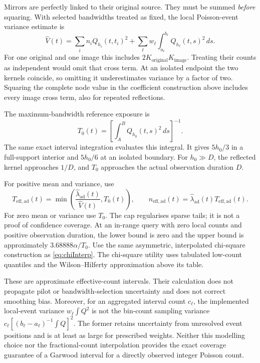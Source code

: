 \documentclass[11pt,a4paper]{article}
\begin{document}
Mirrors are perfectly linked to their original source.  They must be
summed \emph{before} squaring.  With selected bandwidths treated as fixed,
the local Poisson-event variance estimate is
\begin{equation}
  \widehat V(t)=\sum_i n_i Q_{h_i}(t,t_i)^2
      +\sum_\ell w_\ell\int_{a_\ell}^{b_\ell}Q_{h_\ell}(t,s)^2\,ds.
  \label{eq:adaptiveVariance}
\end{equation}
For one original and one image this includes
$2K_{\mathrm{original}}K_{\mathrm{image}}$.  Treating their counts as
independent would omit that cross term.  At an isolated endpoint the two
kernels coincide, so omitting it underestimates variance by a factor of
two.  Squaring the complete node value in the coefficient construction
above includes every image cross term, also for repeated reflections.

The maximum-bandwidth reference exposure is
\begin{equation}
  T_0(t)=\left[\int_A^B Q_{h_0}(t,s)^2\,ds\right]^{-1}.
  \label{eq:reflectedExposure}
\end{equation}
The same exact interval integration evaluates this integral.  It gives
$5h_0/3$ in a full-support interior and $5h_0/6$ at an isolated boundary.
For $h_0\gg D$, the reflected kernel approaches $1/D$, and $T_0$
approaches the actual observation duration $D$.

For positive mean and variance, use
\begin{equation}
  T_{\mathrm{eff,ad}}(t)
    =\min\!\left(\frac{\hat\lambda_{\mathrm{ad}}(t)}{\widehat V(t)},T_0(t)\right),
  \qquad n_{\mathrm{eff,ad}}(t)=\hat\lambda_{\mathrm{ad}}(t)T_{\mathrm{eff,ad}}(t).
  \label{eq:adaptiveEffective}
\end{equation}
For zero mean or variance use $T_0$.  The cap regularises sparse tails;
it is not a proof of confidence coverage.  At an in-range query with zero
local counts and positive observation duration, the lower bound is zero
and the upper bound is approximately $3.68888\alpha/T_0$.
Use the same asymmetric, interpolated chi-square construction as
\eqref{eq:chiInterp}.  The chi-square utility uses tabulated low-count
quantiles and the Wilson--Hilferty approximation above its table.

These are approximate effective-count intervals.  Their calculation does
not propagate pilot or bandwidth-selection uncertainty and does not
correct smoothing bias.  Moreover, for an aggregated interval count
$c_\ell$, the implemented local-event variance
$w_\ell\int Q^2$ is not the bin-count sampling variance
$c_\ell[(b_\ell-a_\ell)^{-1}\int Q]^2$.  The former retains uncertainty
from unresolved event positions and is at least as large for prescribed
weights.  Neither this modelling choice nor the fractional-count
interpolation provides the exact coverage guarantee of a Garwood interval
for a directly observed integer Poisson count.
\end{document}
